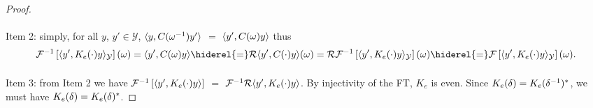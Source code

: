 \begin{proof}
    \paragraph{}
    Item 2: simply, for all $y$, $y'\in\mathcal{Y}$,
    $\langle y, C({\omega}^{-1})y'\rangle$ $=$ $\langle y', C(\omega)y\rangle$ thus
    \begin{dmath*}
        \IFT{\inner{y', K_e(\cdot)y}_{\mathcal{Y}}}(\omega)=\inner{y',
        C(\omega)y}\hiderel{=}\mathcal{R}\inner{y',
        C(\cdot)y}(\omega)=\mathcal{R}\IFT{\inner{y',
        K_e(\cdot)y}_{\mathcal{Y}}}(\omega) \hiderel{=} \FT{\inner{y',
        K_e(\cdot)y}_{\mathcal{Y}}}(\omega).
    \end{dmath*}
    \paragraph{}
    Item 3: from Item 2 we have
    $\mathcal{F}^{-1}\left[\langle y', K_e(\cdot)y\rangle\right]$ $=$ $\mathcal{F}^{-1}\mathcal{R}{\langle y',
    K_e(\cdot)y\rangle}$. By injectivity of the \acl{FT}, $K_e$ is even. Since
    $K_e(\delta)=K_e({\delta}^{-1})^* $, we must have
    $K_e(\delta)=K_e(\delta)^* $.
\end{proof}
